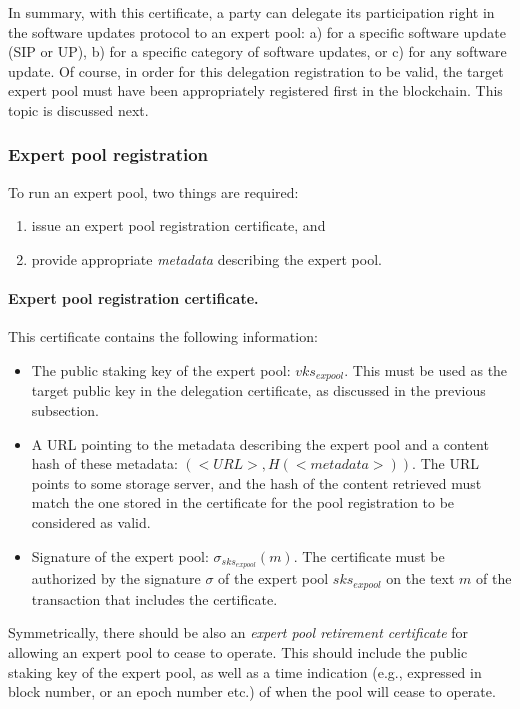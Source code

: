 \documentclass[11pt,a4paper]{article}
\begin{document}
In summary, with this certificate, a party can delegate its participation right
in the software updates protocol to an expert pool: a) for a specific software
update (SIP or UP), b) for a specific category of software updates, or c) for
any software update. Of course, in order for this delegation registration to be
valid, the target expert pool must have been appropriately registered first in
the blockchain. This topic is discussed next.

\subsubsection{Expert pool registration}
\label{sec:expert-pool-registr}

To run an expert pool, two things are required:
\begin{enumerate}
\item issue an expert pool registration certificate, and
\item provide appropriate \emph{metadata} describing the expert pool.
\end{enumerate}

\paragraph{Expert pool registration certificate.}
This certificate contains the following information:
\begin{itemize}
\item The public staking key of the expert pool: $vks_{expool}$. This must be
  used as the target public key in the delegation certificate, as discussed in
  the previous subsection.
\item A URL pointing to the metadata describing the expert pool and a content
  hash of these metadata: $(<URL>, H(<metadata>))$. The URL points to some
  storage server, and the hash of the content retrieved must match the one
  stored in the certificate for the pool registration to be considered as valid.
\item Signature of the expert pool: $\sigma_{sks_{expool}}(m)$. The certificate
  must be authorized by the signature $\sigma$ of the expert pool $sks_{expool}$
  on the text $m$ of the transaction that includes the certificate.
\end{itemize}

Symmetrically, there should be also an \emph{expert pool retirement certificate}
for allowing an expert pool to cease to operate. This should include the public
staking key of the expert pool, as well as a time indication (e.g., expressed in
block number, or an epoch number etc.) of when the pool will cease to operate.
\end{document}
